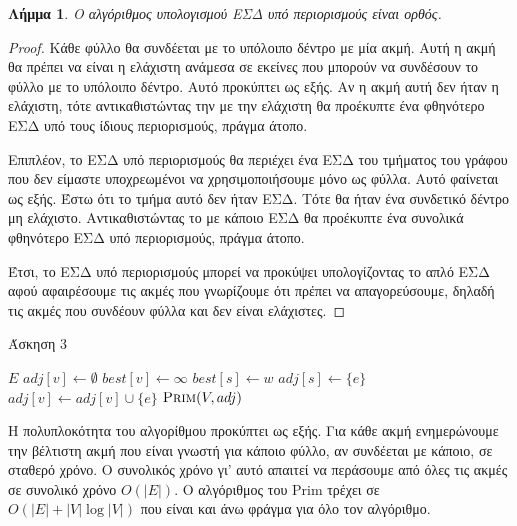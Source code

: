 \documentclass[11pt,a4paper,oneside]{report}
\newtheorem*{lemma}{Λήμμα}
\begin{document}
\begin{lemma}
Ο αλγόριθμος υπολογισμού ΕΣΔ υπό περιορισμούς είναι ορθός.
\end{lemma}
\begin{proof}
Κάθε φύλλο θα συνδέεται με το υπόλοιπο δέντρο με μία ακμή. Αυτή η ακμή θα πρέπει να είναι η ελάχιστη ανάμεσα σε εκείνες που μπορούν να συνδέσουν το φύλλο με το υπόλοιπο δέντρο. Αυτό προκύπτει ως εξής. Αν η ακμή αυτή δεν ήταν η ελάχιστη, τότε αντικαθιστώντας την με την ελάχιστη θα προέκυπτε ένα φθηνότερο ΕΣΔ υπό τους ίδιους περιορισμούς, πράγμα άτοπο.

Επιπλέον, το ΕΣΔ υπό περιορισμούς θα περιέχει ένα ΕΣΔ του τμήματος του γράφου που δεν είμαστε υποχρεωμένοι να χρησιμοποιήσουμε μόνο ως φύλλα. Αυτό φαίνεται ως εξής. Έστω ότι το τμήμα αυτό δεν ήταν ΕΣΔ. Τότε θα ήταν ένα συνδετικό δέντρο μη ελάχιστο. Αντικαθιστώντας το με κάποιο ΕΣΔ θα προέκυπτε ένα συνολικά φθηνότερο ΕΣΔ υπό περιορισμούς, πράγμα άτοπο.

Έτσι, το ΕΣΔ υπό περιορισμούς μπορεί να προκύψει υπολογίζοντας το απλό ΕΣΔ αφού αφαιρέσουμε τις ακμές που γνωρίζουμε ότι πρέπει να απαγορεύσουμε, δηλαδή τις ακμές που συνδέουν φύλλα και δεν είναι ελάχιστες.
\end{proof}

\begin{algorithm}[H]
\caption{\textgreek{Άσκηση 3}}
\begin{algorithmic}[1]

	    \State \Return $E$
	\EndIf
        \State $adj[ v ] \gets \emptyset$
        \State $best[ v ] \gets \infty$
    \EndFor
                            \State $best[ s ] \gets w$
                            \State $adj[ s ] \gets \{ e \}$
                        \EndIf
                    \EndIf
                \EndFor
            \Else
                \State $adj[ v ] \gets adj[ v ] \cup \{ e \}$
            \EndIf
        \EndIf
    \EndFor
    \State \Return $\Call{Prim}{V, adj}$
\EndProcedure
\end{algorithmic}
\end{algorithm}

Η πολυπλοκότητα του αλγορίθμου προκύπτει ως εξής. Για κάθε ακμή ενημερώνουμε την βέλτιστη ακμή που είναι γνωστή για κάποιο φύλλο, αν συνδέεται με κάποιο, σε σταθερό χρόνο. Ο συνολικός χρόνο γι' αυτό απαιτεί να περάσουμε από όλες τις ακμές σε συνολικό χρόνο $O( |E| )$. Ο αλγόριθμος του \textlatin{Prim} τρέχει σε $O(|E| + |V|\log|V|)$ που είναι και άνω φράγμα για όλο τον αλγόριθμο.
\end{document}
